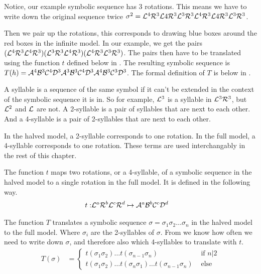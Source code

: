 Notice, our example symbolic sequence has 3 rotations.
This means we have to write down the original sequence twice $\sigma^2 = \mathcal{L}^4\mathcal{R}^3\mathcal{L}4\mathcal{R}^3\mathcal{L}^3\mathcal{R}^3\mathcal{L}^4\mathcal{R}^3\mathcal{L}4\mathcal{R}^3\mathcal{L}^3\mathcal{R}^3$.

Then we pair up the rotations, this corresponds to drawing blue boxes around the red boxes in the infinite model.
In our example, we get the pairs $(\mathcal{L}^4\mathcal{R}^3\mathcal{L}^4\mathcal{R}^3)(\mathcal{L}^3\mathcal{R}^3\mathcal{L}^4\mathcal{R}^3)(\mathcal{L}^4\mathcal{R}^3\mathcal{L}^3\mathcal{R}^3)$.
The pairs then have to be translated using the function $t$ defined below in .
The resulting symbolic sequence is $T(h) = \mathcal{A}^4\mathcal{B}^3\mathcal{C}^4\mathcal{D}^3\mathcal{A}^3\mathcal{B}^3\mathcal{C}^4\mathcal{D}^3\mathcal{A}^4\mathcal{B}^3\mathcal{C}^3\mathcal{D}^3$.
The formal definition of $T$ is below in .

\begin{definition}[Syllables]
    A syllable is a sequence of the same symbol if it can't be extended in the context of the symbolic sequence it is in.
    So for example, $\mathcal{L}^3$ is a syllable in $\mathcal{L}^3\mathcal{R}^3$, but $\mathcal{L}^2$ and $\mathcal{L}$ are not.
    A 2-syllable is a pair of syllables that are next to each other.
    And a 4-syllable is a pair of 2-syllables that are next to each other.

    In the halved model, a 2-syllable corresponds to one rotation.
    In the full model, a 4-syllable corresponds to one rotation.
    These terms are used interchangably in the rest of this chapter.
\end{definition}

\begin{definition}
    \label{def:t}
    The function $t$ maps two rotations, or a 4-syllable, of a symbolic sequence in the halved model to a single rotation in the full model.
    It is defined in the following way.
    \begin{align}
        t: & \mathcal{L}^a\mathcal{R}^b\mathcal{L}^c\mathcal{R}^d \mapsto \mathcal{A}^a\mathcal{B}^b\mathcal{C}^c\mathcal{D}^d
    \end{align}
\end{definition}

\begin{definition}
    \label{def:T}
    The function $T$ translates a symbolic sequence $\sigma = \sigma_1\sigma_2 \dots \sigma_n$ in the halved model to the full model.
    Where $\sigma_i$ are the 2-syllables of $\sigma$.
    From  we know how often we need to write down $\sigma$, and therefore also which 4-syllables to translate with $t$.
    \begin{align}
        T(\sigma) & = \begin{cases}
            t(\sigma_1\sigma_2) \dots t(\sigma_{n-1}\sigma_n) & \text{ if } n | 2 \\
            t(\sigma_1\sigma_2) \dots t(\sigma_n\sigma_1) \dots t(\sigma_{n-1}\sigma_n) & \text{ else }
        \end{cases}
    \end{align}
\end{definition}


